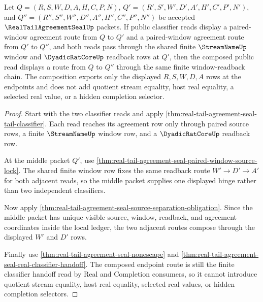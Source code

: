 \begin{theorem}
\label{thm:real-tail-agreement-seal-classifier-transitivity}
Let $Q=(R,S,W,D,A,H,C,P,N)$, $Q'=(R',S',W',D',A',H',C',P',N')$, and $Q''=(R'',S'',W'',D'',A'',H'',C'',P'',N'')$ be accepted $\RealTailAgreementSealUp$ packets. If public classifier reads display a paired-window agreement route from $Q$ to $Q'$ and a paired-window agreement route from $Q'$ to $Q''$, and both reads pass through the shared finite $\StreamNameUp$ window and $\DyadicRatCoreUp$ readback rows at $Q'$, then the composed public read displays a route from $Q$ to $Q''$ through the same finite window-readback chain. The composition exports only the displayed $R,S,W,D,A$ rows at the endpoints and does not add quotient stream equality, host real equality, a selected real value, or a hidden completion selector.
\end{theorem}
\begin{proof}
Start with the two classifier reads and apply \autoref{thm:real-tail-agreement-seal-tail-classifier}. Each read reaches its agreement row only through paired source rows, a finite $\StreamNameUp$ window row, and a $\DyadicRatCoreUp$ readback row.

At the middle packet $Q'$, use \autoref{thm:real-tail-agreement-seal-paired-window-source-lock}. The shared finite window row fixes the same readback route $W' \to D' \to A'$ for both adjacent reads, so the middle packet supplies one displayed hinge rather than two independent classifiers.

Now apply \autoref{thm:real-tail-agreement-seal-source-separation-obligation}. Since the middle packet has unique visible source, window, readback, and agreement coordinates inside the local ledger, the two adjacent routes compose through the displayed $W'$ and $D'$ rows.

Finally use \autoref{thm:real-tail-agreement-seal-nonescape} and \autoref{thm:real-tail-agreement-seal-real-classifier-handoff}. The composed endpoint route is still the finite classifier handoff read by Real and Completion consumers, so it cannot introduce quotient stream equality, host real equality, selected real values, or hidden completion selectors.
\end{proof}

